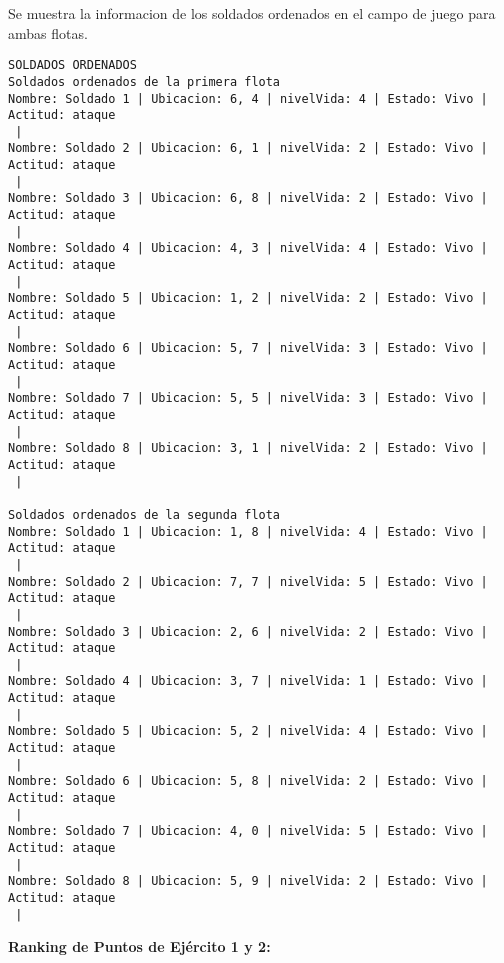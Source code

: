 Se muestra la informacion de los soldados ordenados en el campo de juego para ambas flotas.
\begin{lstlisting}
SOLDADOS ORDENADOS
Soldados ordenados de la primera flota
Nombre: Soldado 1 | Ubicacion: 6, 4 | nivelVida: 4 | Estado: Vivo | Actitud: ataque
 |
Nombre: Soldado 2 | Ubicacion: 6, 1 | nivelVida: 2 | Estado: Vivo | Actitud: ataque
 |
Nombre: Soldado 3 | Ubicacion: 6, 8 | nivelVida: 2 | Estado: Vivo | Actitud: ataque
 |
Nombre: Soldado 4 | Ubicacion: 4, 3 | nivelVida: 4 | Estado: Vivo | Actitud: ataque
 |
Nombre: Soldado 5 | Ubicacion: 1, 2 | nivelVida: 2 | Estado: Vivo | Actitud: ataque
 |
Nombre: Soldado 6 | Ubicacion: 5, 7 | nivelVida: 3 | Estado: Vivo | Actitud: ataque
 |
Nombre: Soldado 7 | Ubicacion: 5, 5 | nivelVida: 3 | Estado: Vivo | Actitud: ataque
 |
Nombre: Soldado 8 | Ubicacion: 3, 1 | nivelVida: 2 | Estado: Vivo | Actitud: ataque
 |

Soldados ordenados de la segunda flota
Nombre: Soldado 1 | Ubicacion: 1, 8 | nivelVida: 4 | Estado: Vivo | Actitud: ataque
 |
Nombre: Soldado 2 | Ubicacion: 7, 7 | nivelVida: 5 | Estado: Vivo | Actitud: ataque
 |
Nombre: Soldado 3 | Ubicacion: 2, 6 | nivelVida: 2 | Estado: Vivo | Actitud: ataque
 |
Nombre: Soldado 4 | Ubicacion: 3, 7 | nivelVida: 1 | Estado: Vivo | Actitud: ataque
 |
Nombre: Soldado 5 | Ubicacion: 5, 2 | nivelVida: 4 | Estado: Vivo | Actitud: ataque
 |
Nombre: Soldado 6 | Ubicacion: 5, 8 | nivelVida: 2 | Estado: Vivo | Actitud: ataque
 |
Nombre: Soldado 7 | Ubicacion: 4, 0 | nivelVida: 5 | Estado: Vivo | Actitud: ataque
 |
Nombre: Soldado 8 | Ubicacion: 5, 9 | nivelVida: 2 | Estado: Vivo | Actitud: ataque
 |
\end{lstlisting}

\textbf{Ranking de Puntos de Ejército 1 y 2:}

